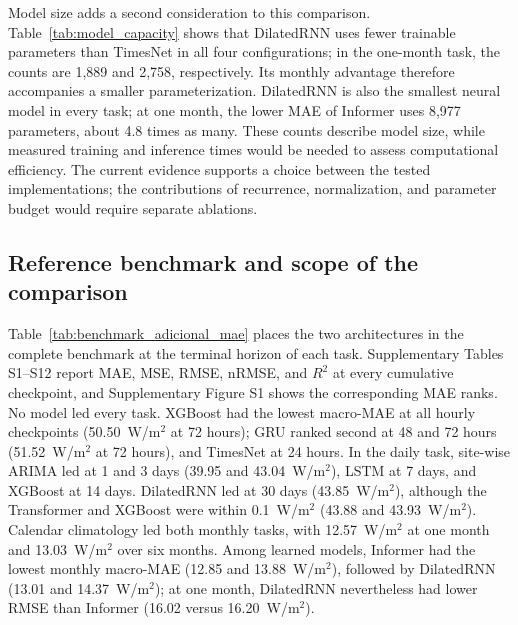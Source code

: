 Model size adds a second consideration to this comparison.
Table~\ref{tab:model_capacity} shows that DilatedRNN uses fewer trainable
parameters than TimesNet in all four configurations; in the one-month
task, the counts are 1,889 and 2,758, respectively. Its monthly advantage
therefore accompanies a smaller parameterization. DilatedRNN is also the
smallest neural model in every task; at one month, the lower MAE of Informer
uses 8,977 parameters, about 4.8 times as many. These counts describe
model size, while measured training and inference times would be needed
to assess computational efficiency. The current evidence supports a
choice between the tested implementations; the contributions of recurrence,
normalization, and parameter budget would require separate ablations.

\subsection{Reference benchmark and scope of the comparison}
\label{sec:reference_benchmark}

Table~\ref{tab:benchmark_adicional_mae} places the two architectures in the
complete benchmark at the terminal horizon of each task. Supplementary
Tables S1--S12 report MAE, MSE, RMSE, nRMSE, and $R^2$ at every cumulative
checkpoint, and Supplementary Figure S1 shows the corresponding MAE ranks.
No model led every task. XGBoost had the lowest macro-MAE at all hourly
checkpoints (50.50~W/m$^2$ at 72 hours); GRU ranked second at 48 and
72 hours (51.52~W/m$^2$ at 72 hours), and TimesNet at 24 hours. In the daily
task, site-wise ARIMA led at 1 and 3 days (39.95 and 43.04~W/m$^2$), LSTM at
7 days, and XGBoost at 14 days. DilatedRNN led at 30 days
(43.85~W/m$^2$), although the Transformer and XGBoost were within
0.1~W/m$^2$ (43.88 and 43.93~W/m$^2$). Calendar climatology led both monthly
tasks, with 12.57~W/m$^2$ at one month and 13.03~W/m$^2$ over six months.
Among learned models, Informer had the lowest monthly macro-MAE (12.85 and
13.88~W/m$^2$), followed by DilatedRNN (13.01 and 14.37~W/m$^2$); at one
month, DilatedRNN nevertheless had lower RMSE than Informer (16.02 versus
16.20~W/m$^2$).



